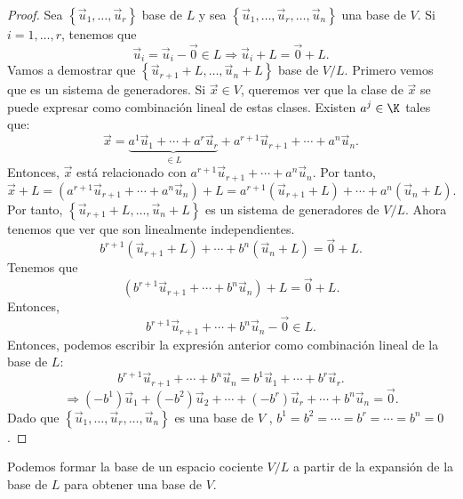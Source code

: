 \begin{proof}
	Sea $\displaystyle \left\{ \vec{u}_{1}, \ldots, \vec{u}_{r}\right\}  $ base de $\displaystyle L $ y sea $\displaystyle \left\{ \vec{u}_{1}, \ldots, \vec{u}_{r}, \ldots, \vec{u}_{n}\right\}  $ una base de $\displaystyle V $. Si $\displaystyle i = 1, \ldots, r $, tenemos que 
	\[\vec{u}_{i} = \vec{u}_{i} - \vec{0} \in L \Rightarrow \vec{u}_{i}+L = \vec{0} + L .\]
	Vamos a demostrar que $\displaystyle \left\{ \vec{u}_{r+1}+L, \ldots, \vec{u}_{n}+L\right\}  $ base de $\displaystyle V/L $. Primero vemos que es un sistema de generadores. Si $\displaystyle \vec{x} \in V $, queremos ver que la clase de $\displaystyle \vec{x} $ se puede expresar como combinación lineal de estas clases. Existen $\displaystyle a^{j}\in\K $ tales que:
	\[ \vec{x} = \underbrace{ a^{1}\vec{u}_{1}+ \cdots + a^{r}\vec{u}_{r}}_{\in L}+ a^{r+1}\vec{u}_{r+1}+\cdots+a^{n}\vec{u}_{n}  .\]
	Entonces, $\displaystyle \vec{x} $ está relacionado con $\displaystyle a^{r+1}\vec{u}_{r+1}+\cdots+a^{n}\vec{u}_{n} $. Por tanto, 
	\[\vec{x} + L = \left(a^{r+1}\vec{u}_{r+1} + \cdots + a^{n}\vec{u}_{n} \right)+L = a^{r+1}\left(\vec{u}_{r+1}+L\right)+\cdots+a^{n}\left(\vec{u}_{n}+L\right).\]
	Por tanto, $\displaystyle \left\{ \vec{u}_{r+1} + L, \ldots, \vec{u}_{n}+ L\right\}  $ es un sistema de generadores de $\displaystyle V/L $. Ahora tenemos que ver que son linealmente independientes. 
	\[b^{r+1}\left(\vec{u}_{r+1}+L\right) + \cdots + b^{n}\left(\vec{u}_{n}+L\right) = \vec{0} + L.\]
Tenemos que
\[(b^{r+1}\vec{u}_{r+1}+ \cdots + b^{n}\vec{u}_{n}) + L = \vec{0} + L .\]
Entonces, 
\[b^{r+1}\vec{u}_{r+1} + \cdots + b^{n}\vec{u}_{n} - \vec{0} \in L .\]
Entonces, podemos escribir la expresión anterior como combinación lineal de la base de $\displaystyle L $: 
\[b^{r+1}\vec{u}_{r+1}+\cdots +b^{n}\vec{u}_{n} = b^{1}\vec{u}_{1} + \cdots + b^{r}\vec{u}_{r} .\]
\[\Rightarrow \left(-b^{1}\right)\vec{u}_{1} + \left(-b^{2}\right)\vec{u}_{2} + \cdots + \left(-b^{r}\right)\vec{u}_{r} + \cdots + b^{n}\vec{u}_{n} = \vec{0} .\]
Dado que $\displaystyle \left\{ \vec{u}_{1}, \ldots, \vec{u}_{r}, \ldots, \vec{u}_{n}\right\}  $ es una base de $\displaystyle V $ , $\displaystyle b^{1} = b^{2} = \cdots = b^{r} = \cdots = b^{n} = 0 $.
\end{proof}

\begin{observation}
\normalfont Podemos formar la base de un espacio cociente $\displaystyle V/L $ a partir de la expansión de la base de $\displaystyle L $ para obtener una base de $\displaystyle V $.
\end{observation}


